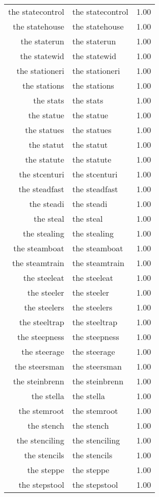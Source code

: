 \begin{table}[ht]
\begin{tabular}{rlr}
  the statecontrol & the statecontrol & 1.00 \\ 
  the statehouse & the statehouse & 1.00 \\ 
  the staterun & the staterun & 1.00 \\ 
  the statewid & the statewid & 1.00 \\ 
  the stationeri & the stationeri & 1.00 \\ 
  the stations & the stations & 1.00 \\ 
  the stats & the stats & 1.00 \\ 
  the statue & the statue & 1.00 \\ 
  the statues & the statues & 1.00 \\ 
  the statut & the statut & 1.00 \\ 
  the statute & the statute & 1.00 \\ 
  the stcenturi & the stcenturi & 1.00 \\ 
  the steadfast & the steadfast & 1.00 \\ 
  the steadi & the steadi & 1.00 \\ 
  the steal & the steal & 1.00 \\ 
  the stealing & the stealing & 1.00 \\ 
  the steamboat & the steamboat & 1.00 \\ 
  the steamtrain & the steamtrain & 1.00 \\ 
  the steeleat & the steeleat & 1.00 \\ 
  the steeler & the steeler & 1.00 \\ 
  the steelers & the steelers & 1.00 \\ 
  the steeltrap & the steeltrap & 1.00 \\ 
  the steepness & the steepness & 1.00 \\ 
  the steerage & the steerage & 1.00 \\ 
  the steersman & the steersman & 1.00 \\ 
  the steinbrenn & the steinbrenn & 1.00 \\ 
  the stella & the stella & 1.00 \\ 
  the stemroot & the stemroot & 1.00 \\ 
  the stench & the stench & 1.00 \\ 
  the stenciling & the stenciling & 1.00 \\ 
  the stencils & the stencils & 1.00 \\ 
  the steppe & the steppe & 1.00 \\ 
  the stepstool & the stepstool & 1.00 \\ 

\end{tabular}
\end{table}
